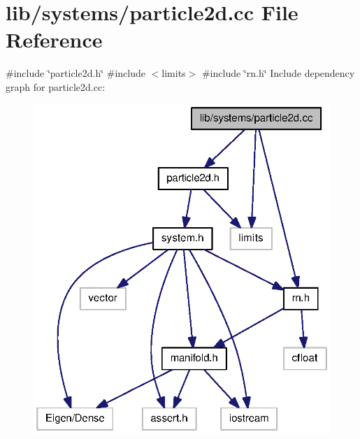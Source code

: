 \section{lib/systems/particle2d.cc \-File \-Reference}
\label{particle2d_8cc}
{\ttfamily \#include \char`\"{}particle2d.\-h\char`\"{}}\*
{\ttfamily \#include $<$limits$>$}\*
{\ttfamily \#include \char`\"{}rn.\-h\char`\"{}}\*
\-Include dependency graph for particle2d.\-cc\-:\nopagebreak
\begin{figure}[H]
\begin{center}
\leavevmode
\includegraphics[width=322pt]{particle2d_8cc__incl}
\end{center}
\end{figure}
